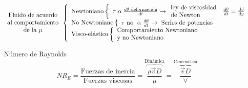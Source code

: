 \[
    \begin{array}{c}
         \text{Fluido de acuerdo}  \\
         \text{al comportamiento} \\
         \text{de la \( \mu \)}
    \end{array}
    \left\{ 
        \begin{array}{l}
             \text{Newtoniano} 
                \left\{
                    \begin{array}{l}
                        \tau \; \alpha \; \frac{ d\theta \text{ deformación} }{ dt } \to 
                            \begin{array}{l}
                                \text{ley de viscosidad} \\
                                \text{de Newton}
                            \end{array}
                    \end{array}
                 \frac{ d\theta }{ dt } = \frac{ d\Vec{v} }{ dy } 
                 \right.\\ 
             \text{No Newtoniano} 
                \left\{
                    \begin{array}{l}
                         \tau \text{ no } \; \alpha \; \frac{ d\theta }{ dt } \to \text{ Series de potencias }
                    \end{array}
                \right.\\ 
             \text{Visco-elástico} 
                \left\{
                    \begin{array}{l}
                         \text{Comportamiento Newtoniano}  \\
                         \text{y no Newtoniano}
                    \end{array}
                \right.
        \end{array}
    \right.    
\]

Número de Raynolds
\[
    NR_{E} = \frac{ \text{Fuerzas de inercia} }{ \text{Fuerzas viscosas} } = \overbrace{ \frac{ \rho \Vec{v} D }{ \mu } }^{ \text{Dinámica} } = \overbrace{ \frac{ \Vec{v}D }{ \forall } }^{ \text{Cinemática} }
\]

